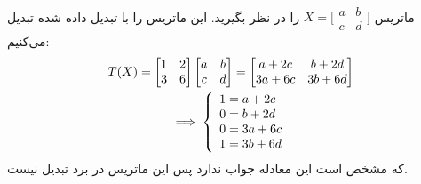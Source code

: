 \\
ماتریس
$X = \bigl[ \begin{smallmatrix}a & b\\ c & d\end{smallmatrix}\bigr]$
را در نظر بگیرید. این ماتریس را با تبدیل داده شده تبدیل می‌کنیم:
\begin{gather*}
    T(X) = \begin{bmatrix}
        1 & 2\\
        3 & 6
    \end{bmatrix}
    \begin{bmatrix}
        a & b\\
        c & d
    \end{bmatrix}
    =
    \begin{bmatrix}
        a + 2c & b + 2d\\
        3a + 6c & 3b + 6d
    \end{bmatrix}\\
    \implies \left\{\begin{array}{r@{\mskip\thickmuskip}l}
		1 &= a + 2c\\
		0 &= b + 2d\\
		0 &= 3a + 6c\\
		1 &= 3b + 6d
    \end{array}\right.
\end{gather*}
که مشخص است این معادله جواب ندارد پس این ماتریس در برد تبدیل نیست.